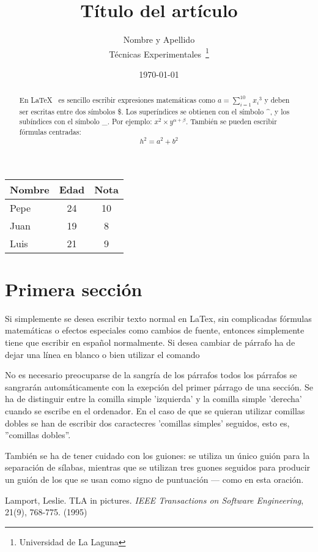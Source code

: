 \documentclass[a4paper,12pt]{article}
\begin{document}
\title{Título del artículo}
\author{Nombre y Apellido \\
Técnicas Experimentales~\footnote{Universidad de La Laguna}
}
\date{\today}
\maketitle
\begin{abstract}
En \LaTeX{}~\cite{Lam:86} es sencillo escribir expresiones
matemáticas como $a=\sum_{i=1}^{10} {x_i}^{3}$
y deben ser escritas entre dos símbolos \$.
Los superíndices se obtienen con el símbolo \^{}, y
los subíndices con el símbolo \_.
Por ejemplo: $x^2 \times y^{\alpha + \beta}$.
También se pueden escribir fórmulas centradas:
\[h^2=a^2 + b^2 \]
\end{abstract}
\bigskip
\begin{tabular}{|l|c|c|}
\hline
Nombre & Edad & Nota \\ \hline
Pepe & 24 & 10 \\ \hline
Juan & 19 & 8 \\ \hline
Luis & 21 & 9 \\ \hline
\end{tabular}
\section{Primera sección}
Si simplemente se desea escribir texto normal en LaTex,
sin complicadas f\'ormulas matem\'aticas o efectos especiales
como cambios de fuente, entonces simplemente tiene que escribir
en espa\~nol normalmente.
Si desea cambiar de párrafo ha de dejar una línea en blanco o bien
utilizar el comando \par
No es necesario preocuparse de la sangría de los párrafos
todos los párrafos se sangrarán automáticamente con la exepción
del primer párrago de una sección.
Se ha de distinguir entre la comilla simple 'izquierda'
y la comilla simple 'derecha' cuando se escribe en el ordenador.
En el caso de que se quieran utilizar comillas dobles se han de 
escribir dos caractecres 'comillas simples' seguidos, esto es,
''comillas dobles''. \par
También se ha de tener cuidado con los guiones: se utiliza un único
guión para la separación de sílabas, mientras que se utilizan
tres guones seguidos para producir un guión de los que se usan
como signo de puntuación --- como en esta oración.
\begin{thebibliography}{00}
Lamport, Leslie.
TLA in pictures.
\emph{IEEE Transactions on Software Engineering},
21(9), 768-775.
(1995)
\end{thebibliography}
\end{document}
